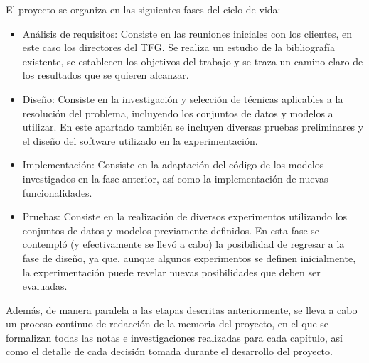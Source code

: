 El proyecto se organiza en las siguientes fases del ciclo de vida:

\begin{itemize}
    \item Análisis de requisitos: Consiste en las reuniones iniciales con los clientes, en este caso los directores del TFG. Se realiza un estudio de la bibliografía existente, se establecen los objetivos del trabajo y se traza un camino claro de los resultados que se quieren alcanzar.
    \item Diseño: Consiste en la investigación y selección de técnicas aplicables a la resolución del problema, incluyendo los conjuntos de datos y modelos a utilizar. En este apartado también se incluyen diversas pruebas preliminares y el diseño del software utilizado en la experimentación.
    \item Implementación: Consiste en la adaptación del código de los modelos investigados en la fase anterior, así como la implementación de nuevas funcionalidades.
    \item Pruebas: Consiste en la realización de diversos experimentos utilizando los conjuntos de datos y modelos previamente definidos. En esta fase se contempló (y efectivamente se llevó a cabo) la posibilidad de regresar a la fase de diseño, ya que, aunque algunos experimentos se definen inicialmente, la experimentación puede revelar nuevas posibilidades que deben ser evaluadas.
\end{itemize}

Además, de manera paralela a las etapas descritas anteriormente, se lleva a cabo un proceso continuo de redacción de la memoria del proyecto, en el que se formalizan todas las notas e investigaciones realizadas para cada capítulo, así como el detalle de cada decisión tomada durante el desarrollo del proyecto.


